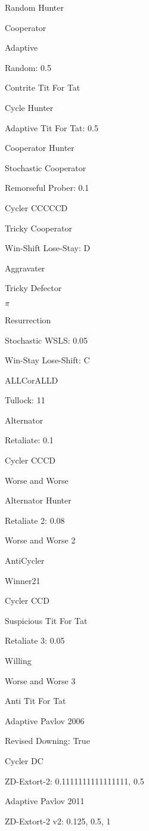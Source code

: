 \item Random Hunter
\item Cooperator
\item Adaptive
\item Random: 0.5
\item Contrite Tit For Tat
\item Cycle Hunter
\item Adaptive Tit For Tat: 0.5
\item Cooperator Hunter
\item Stochastic Cooperator
\item Remorseful Prober: 0.1
\item Cycler CCCCCD
\item Tricky Cooperator
\item Win-Shift Lose-Stay: D
\item Aggravater
\item Tricky Defector
\item $\pi$
\item Resurrection
\item Stochastic WSLS: 0.05
\item Win-Stay Lose-Shift: C
\item ALLCorALLD
\item Tullock: 11
\item Alternator
\item Retaliate: 0.1
\item Cycler CCCD
\item Worse and Worse
\item Alternator Hunter
\item Retaliate 2: 0.08
\item Worse and Worse 2
\item AntiCycler
\item Winner21
\item Cycler CCD
\item Suspicious Tit For Tat
\item Retaliate 3: 0.05
\item Willing
\item Worse and Worse 3
\item Anti Tit For Tat
\item Adaptive Pavlov 2006
\item Revised Downing: True
\item Cycler DC
\item ZD-Extort-2: 0.1111111111111111, 0.5
\item Adaptive Pavlov 2011
\item ZD-Extort-2 v2: 0.125, 0.5, 1

